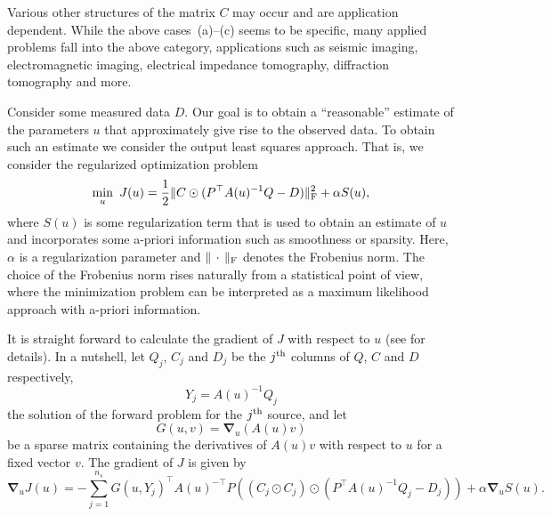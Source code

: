 \documentclass[12pt]{article}
\newcommand{\hf}{\frac12}
\renewcommand{\vec}[1]{\ensuremath{\mathbf{#1}}}
\newcommand{\grad}{\ensuremath {\vec \nabla}}
\begin{document}
Various other structures of the matrix $C$ may occur and are application dependent.  While the above cases~(a)--(c) seems to be specific, many applied problems fall into the above category, applications such as seismic imaging, electromagnetic imaging, electrical impedance tomography, diffraction tomography \cite{smvoz,brocea,devony,na1,jc1} and more.

Consider some measured data $D$. Our goal is to obtain a ``reasonable'' estimate of the parameters $u$ that approximately give rise to the observed data. To obtain such an estimate we consider the output least squares approach. That is, we consider the regularized optimization problem
\begin{equation}
\label{eq:opt}
\min_{u} \ J(u) = \hf \|C \odot (P^{\top}A(u)^{-1}Q - D)\|_{\rm F}^{2} + \alpha S(u),
\end{equation}
where $S(u)$ is some regularization term that is used to obtain an estimate of $u$ and incorporates some a-priori information such as smoothness or sparsity. Here, $\alpha$ is a regularization parameter and $\| \, \cdot \, \|_{\rm F}$ denotes the Frobenius norm. The choice of the Frobenius norm rises naturally from a statistical point of view, where the minimization problem can be interpreted as a maximum likelihood approach with a-priori information.



It is straight forward to calculate the gradient of $J$ with respect to $u$ (see \cite{hao} for details). In a nutshell, let $Q_{j}$, $C_{j}$ and $D_{j}$ be the $j^{\rm th}$ columns of $Q$, $C$ and $D$ respectively,
$$ Y_{j} = A(u)^{-1}Q_{j} $$
the solution of the forward problem for the $j^{\rm th}$ source, and let
$$ G(u,v) = \grad_{u} (A(u)v) $$
be a sparse matrix containing the derivatives of $A(u)v$ with respect to $u$ for a fixed vector $v$. The gradient of $J$ is given by
\begin{equation}
\label{eq:dopt}
\grad_{u}  J(u) = -\sum_{j=1}^{n_{s}} G(u,Y_{j})^{\top}A(u)^{-\top} P\left((C_{j} \odot C_{j}) \odot (P^{\top}A(u)^{-1}Q_{j} - D_{j}) \right) + \alpha \grad_{u}S(u).
\end{equation}
\end{document}
